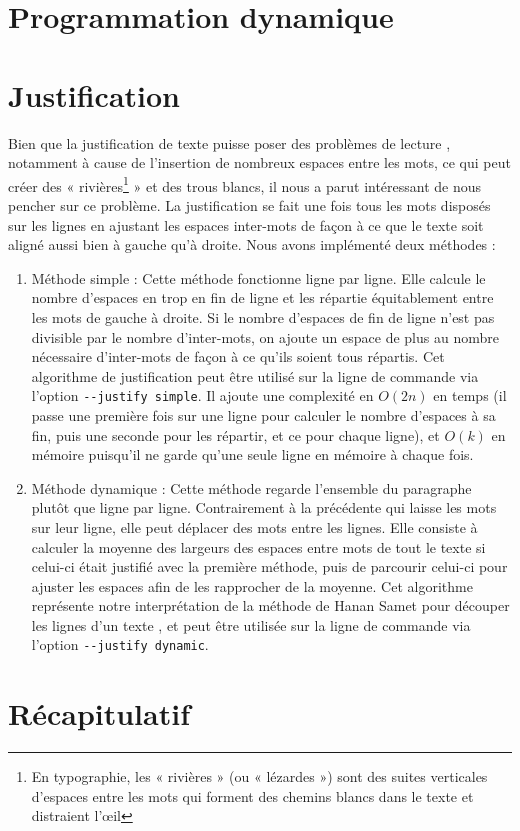 \documentclass[a4paper, 11pt]{article}
\begin{document}
\section{Programmation dynamique}




\section{Justification}
\label{sec:justification}

Bien que la justification de texte puisse poser des problèmes de lecture
\cite{Van96cognitive}, notamment à cause de l'insertion de nombreux espaces
entre les mots, ce qui peut créer des « rivières\footnote{En typographie, les
« rivières » (ou « lézardes ») sont des suites verticales d'espaces entre les
mots qui forment des chemins blancs dans le texte et distraient
l'œil\cite{Harkins12fr}} » et des trous blancs, il nous a parut intéressant de
nous pencher sur ce problème. La justification se fait une fois tous les mots
disposés sur les lignes en ajustant les espaces inter-mots de façon à ce que le
texte soit aligné aussi bien à gauche qu'à droite. Nous avons implémenté deux
méthodes :

\begin{enumerate}
    \item Méthode simple : Cette méthode fonctionne ligne par ligne. Elle
        calcule le nombre d'espaces en trop en fin de ligne et les répartie
        équitablement entre les mots de gauche à droite. Si le nombre d'espaces
        de fin de ligne n'est pas divisible par le nombre d'inter-mots, on
        ajoute un espace de plus au nombre nécessaire d'inter-mots de façon à ce
        qu'ils soient tous répartis. Cet algorithme de justification peut être
        utilisé sur la ligne de commande via l'option \verb|--justify simple|.
        Il ajoute une complexité en $O(2n)$ en temps (il passe une première fois
        sur une ligne pour calculer le nombre d'espaces à sa fin, puis une
        seconde pour les répartir, et ce pour chaque ligne), et $O(k)$ en
        mémoire puisqu'il ne garde qu'une seule ligne en mémoire à chaque fois.
    \item Méthode dynamique : Cette méthode regarde l'ensemble du paragraphe
        plutôt que ligne par ligne. Contrairement à la précédente qui laisse les
        mots sur leur ligne, elle peut déplacer des mots entre les lignes. Elle
        consiste à calculer la moyenne des largeurs des espaces entre mots de
        tout le texte si celui-ci était justifié avec la première méthode, puis
        de parcourir celui-ci pour ajuster les espaces afin de les rapprocher de
        la moyenne. Cet algorithme représente notre interprétation de la méthode
        de Hanan Samet pour découper les lignes d'un texte \cite{Samet82}, et
        peut être utilisée sur la ligne de commande via l'option
        \verb|--justify dynamic|.
\end{enumerate}

\section{Récapitulatif}


\newpage


\end{document}

